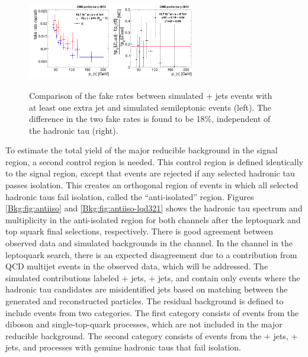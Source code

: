 \begin{figure}[hbt]
  \begin{center}
    \includegraphics[width=0.32\textwidth]{figures/bkgEstim/ttbar_fr_comp_final.pdf}
    \includegraphics[width=0.32\textwidth]{figures/bkgEstim/tfr_diff_ttbar_incl.pdf}
    \caption{Comparison of the fake rates between simulated \Zmm + jets events with at least one extra jet and simulated semileptonic \ttbar events (left). The difference in the two fake rates is found to be 18\%, independent of the hadronic tau \pt (right). \label{fig:fakeratettbardiff}}
  \end{center}
\end{figure}

To estimate the total yield of the major reducible background in the signal region, a second control region is needed. This control region is defined identically to the signal region, except that events are rejected if any selected hadronic tau passes isolation. This creates an orthogonal region of events in which all selected hadronic taus fail isolation, called the ``anti-isolated'' region. Figures \ref{Bkg:fig:antiiso} and \ref{Bkg:fig:antiiso-lqd321} shows the hadronic tau \pt spectrum and multiplicity in the anti-isolated region for both channels after the leptoquark and top squark final selections, respectively. There is good agreement between observed data and simulated backgrounds in the \mutau channel. In the \etau channel in the leptoquark search, there is an expected disagreement due to a contribution from QCD multijet events in the observed data, which will be addressed. The simulated contributions labeled \W + jets, \Z + jets, and \ttbar contain only events where the hadronic tau candidates are misidentified jets based on matching between the generated and reconstructed particles. The residual background is defined to include events from two categories. The first category consists of events from the diboson and single-top-quark processes, which are not included in the major reducible background. The second category consists of events from the \W + jets, \Z + jets, and \ttbar processes with genuine hadronic taus that fail isolation.

